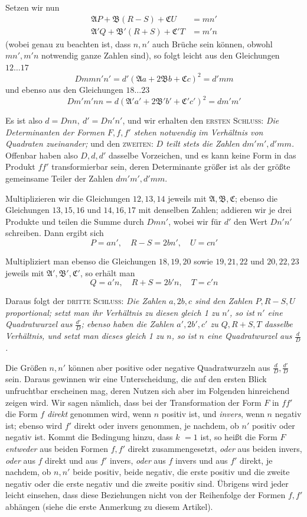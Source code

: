 Setzen wir nun
\[
\begin{aligned}
\mathfrak{A}P+\mathfrak{B}(R-S)+\mathfrak{C}U&=mn'\\
\mathfrak{A}'Q+\mathfrak{B}'(R+S)+\mathfrak{C}'T&=m'n
\end{aligned}
\]
(wobei genau zu beachten ist, dass $n,n'$ auch Brüche sein können, obwohl $mn',m'n$ notwendig ganze Zahlen sind), so folgt leicht aus den Gleichungen $12\ldots17$
\[
Dmmn'n'=d'(\mathfrak{A}a+2\mathfrak{B}b+\mathfrak{C}c)^2=d'mm
\]
und ebenso aus den Gleichungen $18\ldots23$
\[
Dm'm'nn=d(\mathfrak{A}'a'+2\mathfrak{B}'b'+\mathfrak{C}'c')^2=dm'm'
\]

Es ist also $d=Dnn,\ d'=Dn'n'$, und wir erhalten den \textsc{ersten Schluss}: \textit{Die Determinanten der Formen $F,f,f'$ stehen notwendig im Verhältnis von Quadraten zueinander;} und den \textsc{zweiten}: \textit{$D$ teilt stets die Zahlen $dm'm',d'mm$.} Offenbar haben also $D,d,d'$ dasselbe Vorzeichen, und es kann keine Form in das Produkt $ff'$ transformierbar sein, deren Determinante größer ist als der größte gemeinsame Teiler der Zahlen $dm'm',d'mm$.

Multiplizieren wir die Gleichungen $12,13,14$ jeweils mit $\mathfrak{A},\mathfrak{B},\mathfrak{C}$; ebenso die Gleichungen $13,15,16$ und $14,16,17$ mit denselben Zahlen; addieren wir je drei Produkte und teilen die Summe durch $Dmn'$, wobei wir für $d'$ den Wert $Dn'n'$ schreiben. Dann ergibt sich
\[
P=an',\quad R-S=2bn',\quad U=cn'
\]

Multipliziert man ebenso die Gleichungen $18,19,20$ sowie $19,21,22$ und $20,22,23$ jeweils mit $\mathfrak{A}',\mathfrak{B}',\mathfrak{C}'$, so erhält man
\[
Q=a'n,\quad R+S=2b'n,\quad T=c'n
\]

Daraus folgt der \textsc{dritte Schluss}: \textit{Die Zahlen $a,2b,c$ sind den Zahlen $P,R-S,U$ proportional; setzt man ihr Verhältnis zu diesen gleich 1 zu $n'$, so ist $n'$ eine Quadratwurzel aus $\frac{d'}{D}$; ebenso haben die Zahlen $a',2b',c'$ zu $Q,R+S,T$ dasselbe Verhältnis, und setzt man dieses gleich 1 zu $n$, so ist $n$ eine Quadratwurzel aus $\frac{d}{D}$.}

Die Größen $n,n'$ können aber positive oder negative Quadratwurzeln aus $\frac{d}{D},\frac{d'}{D}$ sein. Daraus gewinnen wir eine Unterscheidung, die auf den ersten Blick unfruchtbar erscheinen mag, deren Nutzen sich aber im Folgenden hinreichend zeigen wird. Wir sagen nämlich, dass bei der Transformation der Form $F$ in $ff'$ die Form $f$ \textit{direkt} genommen wird, wenn $n$ positiv ist, und \textit{invers}, wenn $n$ negativ ist; ebenso wird $f'$ direkt oder invers genommen, je nachdem, ob $n'$ positiv oder negativ ist. Kommt die Bedingung hinzu, dass $k$ $=1$ ist, so heißt die Form $F$ \textit{entweder} aus beiden Formen $f,f'$ direkt zusammengesetzt, \textit{oder} aus beiden invers, \textit{oder} aus $f$ direkt und aus $f'$ invers, \textit{oder} aus $f$ invers und aus $f'$ direkt, je nachdem, ob $n,n'$ beide positiv, beide negativ, die erste positiv und die zweite negativ oder die erste negativ und die zweite positiv sind. Übrigens wird jeder leicht einsehen, dass diese Beziehungen nicht von der Reihenfolge der Formen $f,f'$ abhängen (siehe die erste Anmerkung zu diesem Artikel).

